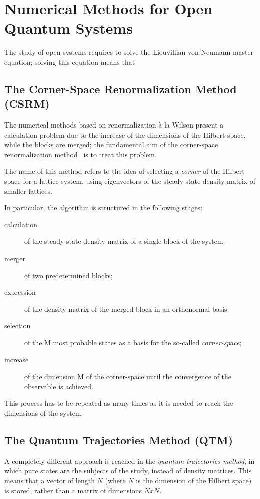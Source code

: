 \chapter{Numerical Methods for Open Quantum Systems}
The study of open systems requires to solve the Liouvillian-von Neumann master equation; solving this equation means that 

\section{The Corner-Space Renormalization Method (CSRM)}
The numerical methods based on renormalization à la Wilson present a calculation problem due to the increase of the dimensions of the Hilbert space, while the blocks are merged; the fundamental aim of the corner-space renormalization method~\cite{PhysRevLett.115.080604} is to treat this problem.

The name of this method refers to the idea of selecting a \emph{corner} of the Hilbert space for a lattice system, using eigenvectors of the steady-state density matrix of smaller lattices.

In particular, the algorithm is structured in the following stages:
\begin{description}
    \item[calculation] of the steady-state density matrix of a single block of the system;
    \item[merger] of two predetermined blocks;
    \item[expression] of the density matrix of the merged block in an orthonormal basis;
    \item[selection] of the M most probable states as a basis for the so-called \emph{corner-space};
    \item[increase] of the dimension M of the corner-space until the convergence of the observable is achieved.
\end{description}

This process has to be repeated as many times as it is needed to reach the dimensions of the system.


\section{The Quantum Trajectories Method (QTM)}
A completely different approach is reached in the \emph{quantum trajectories method}, in which pure states are the subjects of the study, instead of density matrices. This means that a vector of length $N$ (where $N$ is the dimension of the Hilbert space) is stored, rather than a matrix of dimensions $NxN$.

